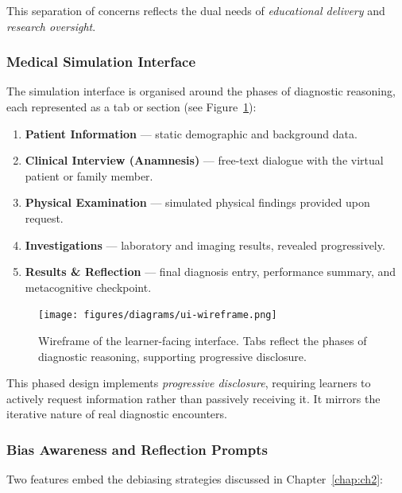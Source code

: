 This separation of concerns reflects the dual needs of \emph{educational delivery}
and \emph{research oversight}.

\subsubsection{Medical Simulation Interface}

The simulation interface is organised around the phases of diagnostic reasoning,
each represented as a tab or section (see Figure~\ref{fig:ui_wireframe}):

\begin{enumerate}
    \item \textbf{Patient Information} — static demographic and background data.
    \item \textbf{Clinical Interview (Anamnesis)} — free-text dialogue with the
    virtual patient or family member.
    \item \textbf{Physical Examination} — simulated physical findings provided
    upon request.
    \item \textbf{Investigations} — laboratory and imaging results, revealed
    progressively.
    \item \textbf{Results \& Reflection} — final diagnosis entry, performance
    summary, and metacognitive checkpoint.
\end{enumerate}

\begin{figure}[h]
    \centering
    \texttt{[image: figures/diagrams/ui-wireframe.png]}
    \caption{Wireframe of the learner-facing interface. Tabs reflect the phases of
    diagnostic reasoning, supporting progressive disclosure.}
    \label{fig:ui_wireframe}
\end{figure}

This phased design implements \emph{progressive disclosure}, requiring learners
to actively request information rather than passively receiving it. It mirrors the
iterative nature of real diagnostic encounters.

\subsubsection{Bias Awareness and Reflection Prompts}

Two features embed the debiasing strategies discussed in
Chapter~\ref{chap:ch2}:


